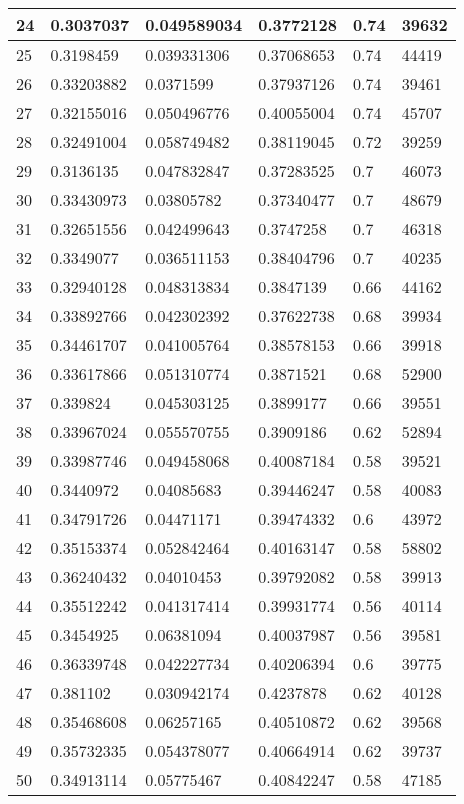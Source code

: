 \begin{longtable}{|l|l|l|l|l|l|}
24 & 0.3037037 & 0.049589034 & 0.3772128 & 0.74 & 39632 \\ \hline 
25 & 0.3198459 & 0.039331306 & 0.37068653 & 0.74 & 44419 \\ \hline 
26 & 0.33203882 & 0.0371599 & 0.37937126 & 0.74 & 39461 \\ \hline 
27 & 0.32155016 & 0.050496776 & 0.40055004 & 0.74 & 45707 \\ \hline 
28 & 0.32491004 & 0.058749482 & 0.38119045 & 0.72 & 39259 \\ \hline 
29 & 0.3136135 & 0.047832847 & 0.37283525 & 0.7 & 46073 \\ \hline 
30 & 0.33430973 & 0.03805782 & 0.37340477 & 0.7 & 48679 \\ \hline 
31 & 0.32651556 & 0.042499643 & 0.3747258 & 0.7 & 46318 \\ \hline 
32 & 0.3349077 & 0.036511153 & 0.38404796 & 0.7 & 40235 \\ \hline 
33 & 0.32940128 & 0.048313834 & 0.3847139 & 0.66 & 44162 \\ \hline 
34 & 0.33892766 & 0.042302392 & 0.37622738 & 0.68 & 39934 \\ \hline 
35 & 0.34461707 & 0.041005764 & 0.38578153 & 0.66 & 39918 \\ \hline 
36 & 0.33617866 & 0.051310774 & 0.3871521 & 0.68 & 52900 \\ \hline 
37 & 0.339824 & 0.045303125 & 0.3899177 & 0.66 & 39551 \\ \hline 
38 & 0.33967024 & 0.055570755 & 0.3909186 & 0.62 & 52894 \\ \hline 
39 & 0.33987746 & 0.049458068 & 0.40087184 & 0.58 & 39521 \\ \hline 
40 & 0.3440972 & 0.04085683 & 0.39446247 & 0.58 & 40083 \\ \hline 
41 & 0.34791726 & 0.04471171 & 0.39474332 & 0.6 & 43972 \\ \hline 
42 & 0.35153374 & 0.052842464 & 0.40163147 & 0.58 & 58802 \\ \hline 
43 & 0.36240432 & 0.04010453 & 0.39792082 & 0.58 & 39913 \\ \hline 
44 & 0.35512242 & 0.041317414 & 0.39931774 & 0.56 & 40114 \\ \hline 
45 & 0.3454925 & 0.06381094 & 0.40037987 & 0.56 & 39581 \\ \hline 
46 & 0.36339748 & 0.042227734 & 0.40206394 & 0.6 & 39775 \\ \hline 
47 & 0.381102 & 0.030942174 & 0.4237878 & 0.62 & 40128 \\ \hline 
48 & 0.35468608 & 0.06257165 & 0.40510872 & 0.62 & 39568 \\ \hline 
49 & 0.35732335 & 0.054378077 & 0.40664914 & 0.62 & 39737 \\ \hline 
50 & 0.34913114 & 0.05775467 & 0.40842247 & 0.58 & 47185 \\ \hline 
\end{longtable}
